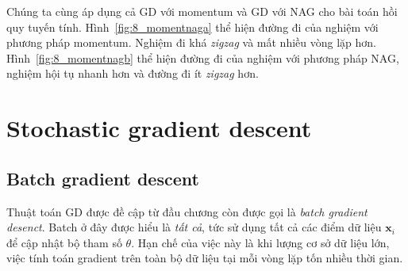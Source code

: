  
Chúng ta cùng áp dụng cả GD với momentum và GD với NAG cho bài toán hồi quy
tuyến tính. Hình~\ref{fig:8_momentnaga} thể hiện đường đi của nghiệm với phương
pháp momentum. Nghiệm đi khá \textit{zigzag} và mất nhiều vòng lặp hơn.
Hình~\ref{fig:8_momentnagb} thể hiện đường đi của nghiệm với phương pháp NAG,
nghiệm hội tụ nhanh hơn và đường đi ít \textit{zigzag} hơn.
 
 
 

 
 
\section{Stochastic gradient descent}

 
 
 
\subsection{Batch gradient descent }
Thuật toán GD được đề cập từ đầu chương còn được gọi là \textit{batch gradient
desenct}. Batch ở đây được hiểu là \textit{tất cả}, tức sử dụng {tất cả} các điểm dữ liệu $\mathbf{x}_i$ để cập nhật bộ tham số $\theta$. Hạn chế của
việc này là khi lượng cơ sở dữ liệu lớn, việc tính toán gradient trên toàn bộ dữ
liệu tại mỗi vòng lặp tốn nhiều thời gian.
 
